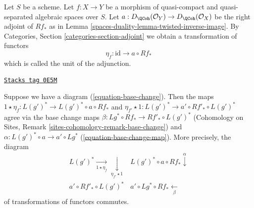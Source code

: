 Let $S$ be a scheme.
Let $f : X \to Y$ be a morphism of quasi-compact and quasi-separated
algebraic spaces over $S$.
Let $a : D_\QCoh(\mathcal{O}_Y) \to D_\QCoh(\mathcal{O}_X)$
be the right adjoint of $Rf_*$ as in
Lemma \ref{spaces-duality-lemma-twisted-inverse-image}. By
Categories, Section \ref{categories-section-adjoint} we obtain a
transformation of functors
$$
\eta_f : \text{id} \to  a \circ Rf_*
$$
which is called the unit of the adjunction.

\begin{lemma}
\label{spaces-duality-lemma-unit-and-base-change}
\href{https://stacks.math.columbia.edu/tag/0E5M}{\texttt{Stacks tag 0E5M}}

Suppose we have a diagram (\ref{equation-base-change}). Then the maps
$1 \star \eta_f : L(g')^* \to L(g')^* \circ a \circ Rf_*$ and
$\eta_{f'} \star 1 : L(g')^* \to a' \circ Rf'_* \circ L(g')^*$
agree via the base change maps
$\beta : Lg^* \circ Rf_* \to Rf'_* \circ L(g')^*$
(Cohomology on Sites, Remark \ref{sites-cohomology-remark-base-change})
and $\alpha : L(g')^* \circ a \to a' \circ Lg^*$
(\ref{equation-base-change-map}).
More precisely, the diagram
$$
\begin{array}{cc}L(g')^* \underset{1 \star \eta_f}{\longrightarrow}\underset{\eta_{f'} \star 1}{\downarrow} & L(g')^* \circ a \circ Rf_* \overset{\alpha}{\downarrow} \\ a' \circ Rf'_* \circ L(g')^* & a' \circ Lg^* \circ Rf_* \underset{\beta}{\longleftarrow}\end{array}
$$
of transformations of functors commutes.
\end{lemma}

